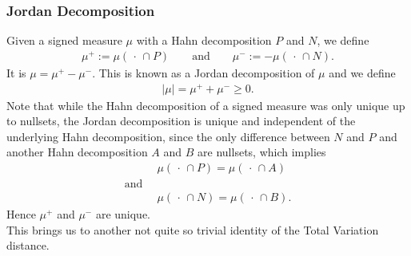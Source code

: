 \documentclass[11pt,a4paper]{article}
\begin{document}
\subsubsection{Jordan Decomposition}
Given a signed measure $\mu$ with a Hahn decomposition $P$ and $N$, we define 
\begin{align*}
\mu^{+}:=\mu(\,\cdot\,\cap{}P)\qquad \text{and}\qquad \mu^{-}:=-\mu(\,\cdot\,\cap{}N). 
\end{align*}
It is $\mu = \mu^{+}-\mu^{-}$. This is known as a Jordan decomposition of $\mu$ and we define
\begin{align*}
|\mu| = \mu^{+}+\mu^{-}\geq{}0.
\end{align*}
Note that while the Hahn decomposition of a signed measure was only unique up to nullsets, the Jordan decomposition is unique and independent of the underlying Hahn decomposition, since the only difference between $N$ and $P$ and another Hahn decomposition $A$ and $B$ are nullsets, which implies 
\begin{align*}
&\mu(\,\cdot\,\cap{}P) = \mu(\,\cdot\,\cap{}A)\\[3pt]\text{and }\,&\\&\mu(\,\cdot\,\cap{}N) = \mu(\,\cdot\,\cap{}B).
\end{align*}
Hence $\mu^{+}$ and $\mu^{-}$ are unique.\vspace{2em}\\
This brings us to another not quite so trivial identity of the Total Variation distance.
\end{document}
